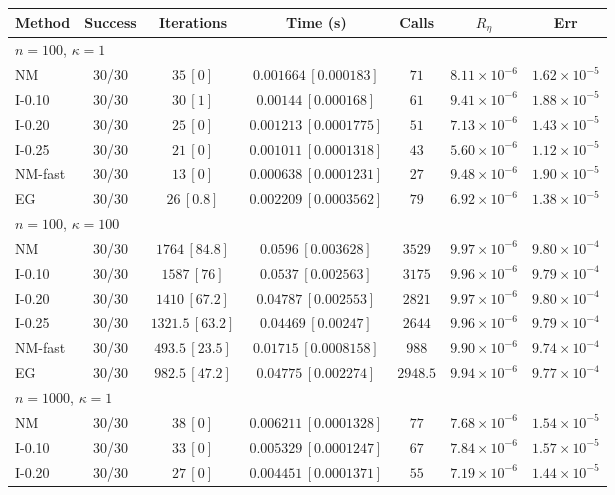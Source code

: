\begin{tabular}{lcccccc}
\toprule
Method & Success & Iterations & Time (s) & Calls & $R_\eta$ & Err \\
\midrule
\multicolumn{7}{l}{$n=100$, $\kappa=1$} \\
NM & 30/30 & $35\, [0]$ & $0.001664\, [0.000183]$ & $71$ & $8.11\times10^{-6}$ & $1.62\times10^{-5}$ \\
I-0.10 & 30/30 & $30\, [1]$ & $0.00144\, [0.000168]$ & $61$ & $9.41\times10^{-6}$ & $1.88\times10^{-5}$ \\
I-0.20 & 30/30 & $25\, [0]$ & $0.001213\, [0.0001775]$ & $51$ & $7.13\times10^{-6}$ & $1.43\times10^{-5}$ \\
I-0.25 & 30/30 & $21\, [0]$ & $0.001011\, [0.0001318]$ & $43$ & $5.60\times10^{-6}$ & $1.12\times10^{-5}$ \\
NM-fast & 30/30 & $13\, [0]$ & $0.000638\, [0.0001231]$ & $27$ & $9.48\times10^{-6}$ & $1.90\times10^{-5}$ \\
EG & 30/30 & $26\, [0.8]$ & $0.002209\, [0.0003562]$ & $79$ & $6.92\times10^{-6}$ & $1.38\times10^{-5}$ \\
\midrule
\multicolumn{7}{l}{$n=100$, $\kappa=100$} \\
NM & 30/30 & $1764\, [84.8]$ & $0.0596\, [0.003628]$ & $3529$ & $9.97\times10^{-6}$ & $9.80\times10^{-4}$ \\
I-0.10 & 30/30 & $1587\, [76]$ & $0.0537\, [0.002563]$ & $3175$ & $9.96\times10^{-6}$ & $9.79\times10^{-4}$ \\
I-0.20 & 30/30 & $1410\, [67.2]$ & $0.04787\, [0.002553]$ & $2821$ & $9.97\times10^{-6}$ & $9.80\times10^{-4}$ \\
I-0.25 & 30/30 & $1321.5\, [63.2]$ & $0.04469\, [0.00247]$ & $2644$ & $9.96\times10^{-6}$ & $9.79\times10^{-4}$ \\
NM-fast & 30/30 & $493.5\, [23.5]$ & $0.01715\, [0.0008158]$ & $988$ & $9.90\times10^{-6}$ & $9.74\times10^{-4}$ \\
EG & 30/30 & $982.5\, [47.2]$ & $0.04775\, [0.002274]$ & $2948.5$ & $9.94\times10^{-6}$ & $9.77\times10^{-4}$ \\
\midrule
\multicolumn{7}{l}{$n=1000$, $\kappa=1$} \\
NM & 30/30 & $38\, [0]$ & $0.006211\, [0.0001328]$ & $77$ & $7.68\times10^{-6}$ & $1.54\times10^{-5}$ \\
I-0.10 & 30/30 & $33\, [0]$ & $0.005329\, [0.0001247]$ & $67$ & $7.84\times10^{-6}$ & $1.57\times10^{-5}$ \\
I-0.20 & 30/30 & $27\, [0]$ & $0.004451\, [0.0001371]$ & $55$ & $7.19\times10^{-6}$ & $1.44\times10^{-5}$ \\

\end{tabular}
